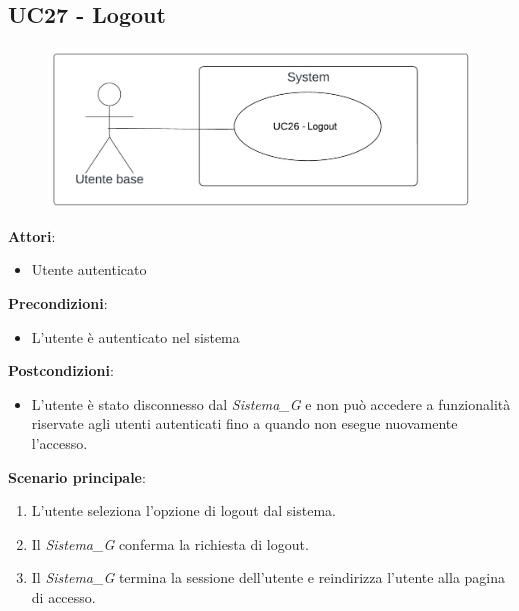 \subsection{UC27 - Logout}\label{usecase:27}
\begin{figure}[H]
\centering
\includegraphics[width=0.75\linewidth]{ucd/UCD27.png}
\end{figure}
\textbf{Attori}:
\begin{itemize}
    \item Utente autenticato
\end{itemize}
\textbf{Precondizioni}:
\begin{itemize}
    \item L'utente è autenticato nel sistema
\end{itemize}
\textbf{Postcondizioni}:
\begin{itemize}
    \item L'utente è stato disconnesso dal \textit{Sistema_G} e non può accedere a funzionalità riservate agli utenti autenticati fino a quando non esegue nuovamente l'accesso.
\end{itemize}
\textbf{Scenario principale}:
\begin{enumerate}
    \item L'utente seleziona l'opzione di logout dal sistema.
    \item Il \textit{Sistema_G} conferma la richiesta di logout.
    \item Il \textit{Sistema_G} termina la sessione dell'utente e reindirizza l'utente alla pagina di accesso.
\end{enumerate}

\newpage